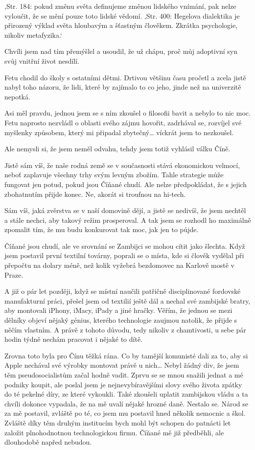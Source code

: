 ‚Str. 184: pokud změnu světa definujeme změnou lidského vnímání, pak nelze vyloučit, že se mění pouze toto lidské vědomí. ‚Str. 400: Hegelova dialektika je přirozený výklad světa hloubavým a šťastným člověkem. Zkrátka psychologie, nikoliv metafyzika.‘

Chvíli jsem nad tím přemýšlel a usoudil, že už chápu, proč můj adoptivní syn svůj vnitřní život nesdílí. 

Fetu chodil do školy s ostatními dětmi. Drtivou většinu času pročetl a zcela jistě nabyl toho názoru, že lidi, které by zajímalo to co jeho, jinde než na univerzitě nepotká.

Asi měl pravdu, jednou jsem se s ním zkoušel o filosofii bavit a nebylo to nic moc. Fetu naprosto nezvládl o oblasti svého zájmu hovořit, zadrhával se, rozvíjel své myšlenky způsobem, který mi připadal zbytečný… víckrát jsem to nezkoušel.

Ale nemysli si, že jsem neměl odvahu, tehdy jsem totiž vyhlásil válku Číně.

Jistě sám víš, že naše rodná země se v současnosti stává ekonomickou velmocí, neboť zaplavuje všechny trhy svým levným zbožím. Tahle strategie může fungovat jen potud, pokud jsou Číňané chudí. Ale nelze předpokládat, že s jejich zbohatnutím přijde konec. Ne, akorát si troufnou na hi-tech. 

Sám víš, jaká zvěrstva se v naší domovině dějí, a jistě se nedivíš, že jsem nechtěl a stále nechci, aby takový režim prosperoval. A tak jsem se rozhodl ho maximálně zpomalit tím, že mu budu konkurovat tak moc, jak jen to půjde.

Číňané jsou chudí, ale ve srovnání se Zambijci se mohou cítit jako šlechta. Když jsem postavil první textilní továrny, poprali se o místa, kde si člověk vydělal při přepočtu na dolary méně, než kolik vyžebrá bezdomovec na Karlově mostě v Praze.

A již o pár let později, když se místní naučili patřičně disciplinované fordovské manufakturní práci, přešel jsem od textilií ještě dál a nechal své zambijské bratry, aby montovali iPhony, iMacy, iPady a jiné hračky. Věřím, že jednou se mezi dělníky objeví nějaký génius, kterého technologie zaujmou natolik, že přijde s něčím vlastním. A právě z tohoto důvodu, tedy nikoliv z chamtivosti, u sebe pár hodin týdně nechám pracovat i nějaké to dítě.

Zrovna toto byla pro Čínu těžká rána. Co by tamější komunisté dali za to, aby si Apple nechával své výrobky montovat právě u nich… Nebyl žádný div, že jsem těm pseudosocialistům začal hodně vadit. Zprvu se se mnou snažili jednat a mé podniky koupit, ale poslal jsem je nejnevybíravějšími slovy svého života zpátky do té pekelné díry, ze které vykoukli. Také zkoušeli uplatit zambijskou vládu a ta chvíli dokonce vypadala, že na mě uvalí nějaké hrozné daně. Nestalo se. Národ se za mě postavil, zvláště po té, co jsem mu postavil hned několik nemocnic a škol. Zvláště díky těm druhým institucím bych mohl být schopen do patnácti let založit plnohodnotnou technologickou firmu. Číňané mě již předběhli, ale dlouhodobě napřed nebudou. 

